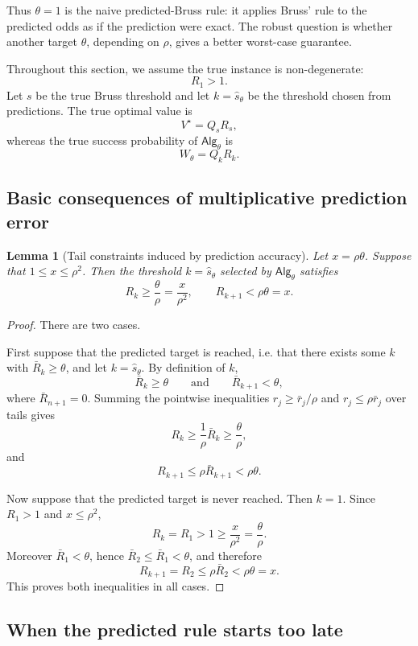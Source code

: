 \documentclass[11pt,a4paper]{article}
\newtheorem{lemma}{Lemma}
\newcommand{\alg}{\mathsf{Alg}}
\begin{document}
Thus \(\theta=1\) is the naive predicted-Bruss rule: it applies Bruss' rule to
the predicted odds as if the prediction were exact.  The robust question is
whether another target \(\theta\), depending on \(\rho\), gives a better worst-case
guarantee.

Throughout this section, we assume the true instance is non-degenerate:
\[
  R_1>1.
\]
Let \(s\) be the true Bruss threshold and let \(k=\hat s_\theta\) be the threshold
chosen from predictions.  The true optimal value is
\[
  V^\star=Q_sR_s,
\]
whereas the true success probability of \(\alg_\theta\) is
\[
  W_\theta=Q_kR_k.
\]

\subsection{Basic consequences of multiplicative prediction error}

\begin{lemma}[Tail constraints induced by prediction accuracy]
\label{lem:tail-constraints}
Let \(x=\rho\theta\).  Suppose that \(1\le x\le \rho^2\).  Then the threshold
\(k=\hat s_\theta\) selected by \(\alg_\theta\) satisfies
\[
  R_k\ge\frac{\theta}{\rho}=\frac{x}{\rho^2},
  \qquad
  R_{k+1}<\rho\theta=x.
\]
\end{lemma}

\begin{proof}
There are two cases.

First suppose that the predicted target is reached, i.e. that there exists some
\(k\) with \(\bar R_k\ge\theta\), and let \(k=\hat s_\theta\).  By definition of
\(k\),
\[
  \bar R_k\ge\theta
  \qquad\text{and}\qquad
  \bar R_{k+1}<\theta,
\]
where \(\bar R_{n+1}=0\).  Summing the pointwise inequalities
\(r_j\ge\bar r_j/\rho\) and \(r_j\le\rho\bar r_j\) over tails gives
\[
  R_k\ge\frac1\rho\bar R_k\ge\frac{\theta}{\rho},
\]
and
\[
  R_{k+1}\le\rho\bar R_{k+1}<\rho\theta.
\]

Now suppose that the predicted target is never reached.  Then \(k=1\).  Since
\(R_1>1\) and \(x\le\rho^2\),
\[
  R_k=R_1>1\ge\frac{x}{\rho^2}=\frac{\theta}{\rho}.
\]
Moreover \(\bar R_1<\theta\), hence \(\bar R_2\le\bar R_1<\theta\), and therefore
\[
  R_{k+1}=R_2\le\rho\bar R_2<\rho\theta=x.
\]
This proves both inequalities in all cases.
\end{proof}

\subsection{When the predicted rule starts too late}
\end{document}
